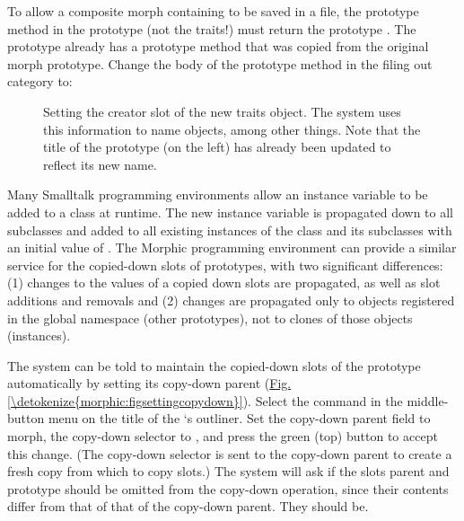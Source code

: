 \documentclass[letterpaper,10pt,english]{sphinxmanual}
\begin{document}
To allow a composite morph containing  to be saved in a file, the prototype method in the prototype (not the traits!) must return the prototype . The  prototype already has a prototype method that was copied from the original morph prototype. Change the body of the prototype method in the \sphinxquotedblleft{}filing out\sphinxquotedblright{} category to:

\begin{sphinxVerbatim}[commandchars=\\\{\}]
\end{sphinxVerbatim}
\begin{figure}[htbp]
\centering
\capstart

\noindent{}
\caption{Setting the creator slot of the new traits object. The system uses this information to name objects, among other things. Note that the title of the prototype (on the left) has already been updated to reflect its new name.}\label{\detokenize{morphic:id11}}\end{figure}

Many Smalltalk programming environments allow an instance variable to be added to a class at runtime. The new instance variable is propagated down to all subclasses and added to all existing instances of the class and its subclasses with an initial value of . The Morphic programming environment can provide a similar service for the copied-down slots of prototypes, with two significant differences: (1) changes to the values of a copied down slots are propagated, as well as slot additions and removals and (2) changes are propagated only to objects registered in the global namespace (other prototypes), not to clones of those objects (instances).

The system can be told to maintain the copied-down slots of the  prototype automatically by setting its copy-down parent (\hyperref[\detokenize{morphic:figsettingcopydown}]{Fig.\@ \ref{\detokenize{morphic:figsettingcopydown}}}). Select the  command in the middle-button menu on the title of the `s outliner. Set the copy-down parent field to \sphinxquotedblleft{}morph\sphinxquotedblright{}, the copy-down selector to , and press the green (top) button to accept this change. (The copy-down selector is sent to the copy-down parent to create a fresh copy from which to copy slots.) The system will ask if the slots \sphinxquotedblleft{}parent\sphinxquotedblright{} and \sphinxquotedblleft{}prototype\sphinxquotedblright{} should be omitted from the copy-down operation, since their contents differ from that of that of the copy-down parent. They should be.
\end{document}
